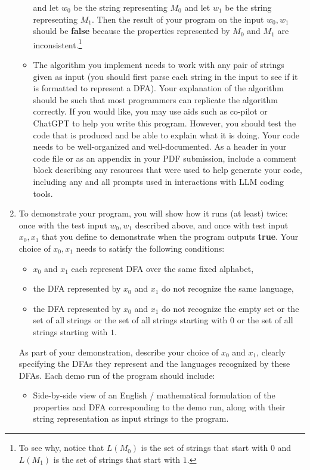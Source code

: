 \documentclass[12pt, oneside]{article}
\begin{document}
\begin{enumerate}
\begin{itemize}
   and let $w_0$ be the string representing $M_0$ and let $w_1$ be the string representing $M_1$. Then the result of your program on the input $w_0, w_1$ 
   should be {\bf false} because the properties represented by $M_0$ and $M_1$ 
   are inconsistent.\footnote{To see why, notice that $L(M_0)$ is the set of strings that start with $0$ and $L(M_1)$ is the set of strings that start with $1$.}
   \item The algorithm you implement needs to work with any pair of strings given as input (you should first parse each string in the input to see if it is formatted to represent a DFA). Your explanation of the algorithm should be such that most programmers can replicate the algorithm correctly. If you would like, you may use aids such as co-pilot or ChatGPT to help you write this program. 
   However, you should test the code that is produced and be able to explain what it is doing. Your code needs to be well-organized and well-documented.
   As a header in your code file or as an appendix in your PDF submission, include a comment block describing any resources that were used to 
   help generate your code, including any and all prompts used in interactions 
   with LLM coding tools.
\end{itemize}
\item To demonstrate your program, you will show how it runs (at least) twice: once with the test input $w_0, w_1$ described above, and once with test input $x_0, x_1$ that you define to demonstrate when the program outputs {\bf true}. Your choice of $x_0, x_1$ needs to satisfy the following conditions:
\begin{itemize}
\item $x_0$ and $x_1$ each represent DFA over the same fixed alphabet, 
\item the DFA represented by $x_0$ and $x_1$ do not recognize the same language,
\item the DFA represented by $x_0$ and $x_1$ do not recognize the empty set or the set of all strings or the set of all strings starting with $0$ or the set of all strings starting with $1$.
\end{itemize}  
As part of your demonstration, describe your choice of $x_0$ and $x_1$, clearly 
specifying the DFAs they represent and the languages recognized by these DFAs.
Each demo run of the program should include: 
\begin{itemize}
\item Side-by-side view of an English / mathematical formulation of the properties and DFA corresponding to the demo run, along with their string representation as input strings to the program.

\end{itemize}
\end{enumerate}
\end{document}
